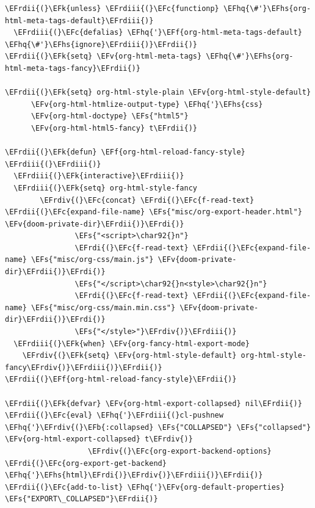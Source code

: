 \documentclass{scrartcl}
\newcommand{\EFk}[1]{\textcolor{EFk}{#1}} %
\newcommand{\EFs}[1]{\textcolor{EFs}{#1}} %
\newcommand{\EFb}[1]{\textcolor{EFb}{#1}} %
\newcommand{\EFc}[1]{\textcolor{EFc}{#1}} %
\newcommand{\EFv}[1]{\textcolor{EFv}{#1}} %
\newcommand{\EFf}[1]{\textcolor{EFf}{#1}} %
\newcommand{\EFhq}[1]{\textcolor{EFhq}{#1}} %
\newcommand{\EFhs}[1]{\textcolor{EFhs}{#1}} %
\newcommand{\EFrdi}[1]{\textcolor{EFrdi}{#1}} %
\newcommand{\EFrdii}[1]{\textcolor{EFrdii}{#1}} %
\newcommand{\EFrdiii}[1]{\textcolor{EFrdiii}{#1}} %
\newcommand{\EFrdiv}[1]{\textcolor{EFrdiv}{#1}} %
\begin{document}
\begin{Code}
\begin{Verbatim}[]
\EFrdii{(}\EFk{unless} \EFrdiii{(}\EFc{functionp} \EFhq{\#'}\EFhs{org-html-meta-tags-default}\EFrdiii{)}
  \EFrdiii{(}\EFc{defalias} \EFhq{'}\EFf{org-html-meta-tags-default} \EFhq{\#'}\EFhs{ignore}\EFrdiii{)}\EFrdii{)}
\EFrdii{(}\EFk{setq} \EFv{org-html-meta-tags} \EFhq{\#'}\EFhs{org-html-meta-tags-fancy}\EFrdii{)}

\EFrdii{(}\EFk{setq} org-html-style-plain \EFv{org-html-style-default}
      \EFv{org-html-htmlize-output-type} \EFhq{'}\EFhs{css}
      \EFv{org-html-doctype} \EFs{"html5"}
      \EFv{org-html-html5-fancy} t\EFrdii{)}

\EFrdii{(}\EFk{defun} \EFf{org-html-reload-fancy-style} \EFrdiii{(}\EFrdiii{)}
  \EFrdiii{(}\EFk{interactive}\EFrdiii{)}
  \EFrdiii{(}\EFk{setq} org-html-style-fancy
        \EFrdiv{(}\EFc{concat} \EFrdi{(}\EFc{f-read-text} \EFrdii{(}\EFc{expand-file-name} \EFs{"misc/org-export-header.html"} \EFv{doom-private-dir}\EFrdii{)}\EFrdi{)}
                \EFs{"<script>\char92{}n"}
                \EFrdi{(}\EFc{f-read-text} \EFrdii{(}\EFc{expand-file-name} \EFs{"misc/org-css/main.js"} \EFv{doom-private-dir}\EFrdii{)}\EFrdi{)}
                \EFs{"</script>\char92{}n<style>\char92{}n"}
                \EFrdi{(}\EFc{f-read-text} \EFrdii{(}\EFc{expand-file-name} \EFs{"misc/org-css/main.min.css"} \EFv{doom-private-dir}\EFrdii{)}\EFrdi{)}
                \EFs{"</style>"}\EFrdiv{)}\EFrdiii{)}
  \EFrdiii{(}\EFk{when} \EFv{org-fancy-html-export-mode}
    \EFrdiv{(}\EFk{setq} \EFv{org-html-style-default} org-html-style-fancy\EFrdiv{)}\EFrdiii{)}\EFrdii{)}
\EFrdii{(}\EFf{org-html-reload-fancy-style}\EFrdii{)}

\EFrdii{(}\EFk{defvar} \EFv{org-html-export-collapsed} nil\EFrdii{)}
\EFrdii{(}\EFc{eval} \EFhq{'}\EFrdiii{(}cl-pushnew \EFhq{'}\EFrdiv{(}\EFb{:collapsed} \EFs{"COLLAPSED"} \EFs{"collapsed"} \EFv{org-html-export-collapsed} t\EFrdiv{)}
                   \EFrdiv{(}\EFc{org-export-backend-options} \EFrdi{(}\EFc{org-export-get-backend} \EFhq{'}\EFhs{html}\EFrdi{)}\EFrdiv{)}\EFrdiii{)}\EFrdii{)}
\EFrdii{(}\EFc{add-to-list} \EFhq{'}\EFv{org-default-properties} \EFs{"EXPORT\_COLLAPSED"}\EFrdii{)}


\end{Verbatim}
\end{Code}
\end{document}

